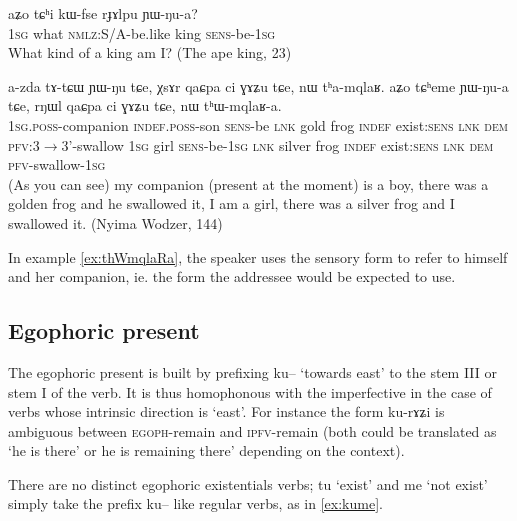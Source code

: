 \documentclass[oldfontcommands,oneside,a4paper,11pt]{article}
\newcommand{\ipa}[1]{{\phon \mbox{#1}}} %
\begin{document}
\begin{exe}
\ex \label{ex:mtChi.kWfse.rJAlpu}
\gll
\ipa{aʑo}  	\ipa{tɕʰi}  	\ipa{kɯ-fse}  	\ipa{rɟɤlpu}  	\ipa{ɲɯ-ŋu-a?}  \\
\textsc{1sg} what \textsc{nmlz}:S/A-be.like king \textsc{sens}-be-\textsc{1sg} \\
\glt What kind of a king am I? (The ape  king, 23)
\end{exe}


\begin{exe}
\ex \label{ex:thWmqlaRa}
\gll
\ipa{a-zda}  	\ipa{tɤ-tɕɯ}  	\ipa{ɲɯ-ŋu}  	\ipa{tɕe,}  	\ipa{χsɤr}  	\ipa{qaɕpa}  	\ipa{ci}  	\ipa{ɣɤʑu}  	\ipa{tɕe,}  	\ipa{nɯ}  	\ipa{tʰa-mqlaʁ.} \ipa{aʑo}  	\ipa{tɕʰeme}  	\ipa{ɲɯ-ŋu-a}  	\ipa{tɕe,}  	\ipa{rŋɯl}  	\ipa{qaɕpa}  	\ipa{ci}  	\ipa{ɣɤʑu}  	\ipa{tɕe,}  	\ipa{nɯ}  	\ipa{tʰɯ-mqlaʁ-a.}  \\
\textsc{1sg.poss}-companion \textsc{indef.poss}-son \textsc{sens}-be  \textsc{lnk} gold frog \textsc{indef} exist:\textsc{sens} \textsc{lnk} \textsc{dem} \textsc{pfv}:3$\rightarrow$3'-swallow \textsc{1sg} girl \textsc{sens}-be-\textsc{1sg}  \textsc{lnk} silver frog \textsc{indef} exist:\textsc{sens} \textsc{lnk} \textsc{dem} \textsc{pfv}-swallow-\textsc{1sg} \\
\glt (As you can see) my companion (present at the moment) is a boy, there was a golden frog and he swallowed it, I am a girl, there was a silver frog and I swallowed it. (Nyima Wodzer, 144)
\end{exe}

In example \ref{ex:thWmqlaRa}, the speaker uses the sensory form to refer to himself and her companion, ie. the form the addressee would be expected to use. 


\subsection{Egophoric present } \label{sec:egoph}
The egophoric present  is built by prefixing \ipa{ku--} `towards east' to the stem III or stem I of the verb. It is thus homophonous with the imperfective in the case of verbs whose intrinsic direction is `east'.  For instance the form \ipa{ku-rɤʑi} is ambiguous between \textsc{egoph}-remain and \textsc{ipfv}-remain (both could be translated as `he is there' or he is remaining there' depending on the context).

There are no distinct egophoric existentials verbs; \ipa{tu} `exist' and \ipa{me}  `not exist' simply take the prefix \ipa{ku--} like regular verbs, as in \ref{ex:kume}.
\end{document}
